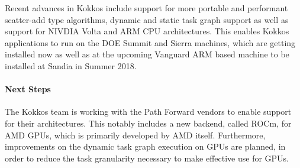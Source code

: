 Recent advances in Kokkos include support for more portable and performant scatter-add type algorithms, dynamic and static task graph support as well as support for NIVDIA Volta and ARM CPU architectures. 
This enables Kokkos applications to run on the DOE Summit and Sierra machines, which are getting installed now as well as at the upcoming Vanguard ARM based machine to be installed at Sandia in Summer 2018. 
  
\paragraph{Next Steps}

The Kokkos team is working with the Path Forward vendors to enable support for their architectures. 
This notably includes a new backend, called ROCm, for AMD GPUs, which is primarily developed by AMD itself. 
Furthermore, improvements on the dynamic task graph execution on GPUs are planned, in order to reduce the task granularity necessary to make effective use for GPUs. 
